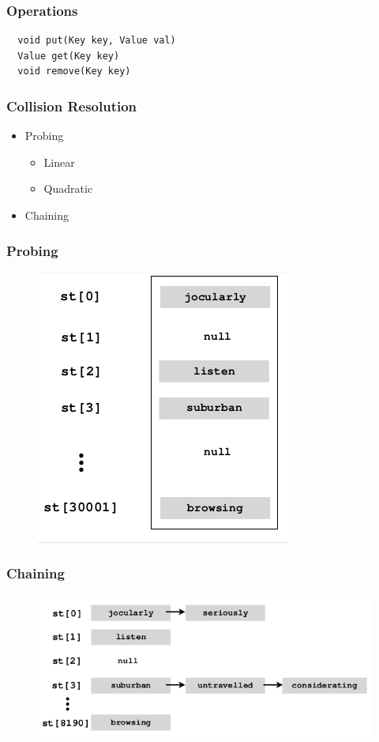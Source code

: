 \documentclass{beamer}
\begin{document}
\begin{frame}[fragile]
\frametitle{Operations}
\begin{verbatim}
  void put(Key key, Value val)
  Value get(Key key)
  void remove(Key key)
\end{verbatim}
\end{frame}

\begin{frame}
\frametitle{Collision Resolution}
\begin{itemize}
  \item Probing
  \begin{itemize}
    \item Linear
    \item Quadratic
  \end{itemize}
  \item Chaining
\end{itemize}
\end{frame}

\begin{frame}
\frametitle{Probing}
\begin{figure}
\includegraphics[width=0.4\linewidth]{probing.png}
\end{figure}
\end{frame}
\begin{frame}
\frametitle{Chaining}
\begin{figure}
\includegraphics[width=0.8\linewidth]{chain.png}
\end{figure}
\end{frame}
\end{document}
